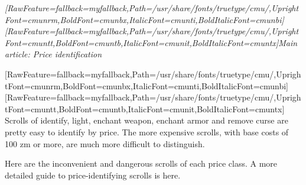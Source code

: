 \begin{myquote}
\item{}{\itshape \allowbreak{}\setmainfont{cmunti.ttf}[RawFeature={fallback=myfallback},Path=/usr/share/fonts/truetype/cmu/,UprightFont=cmunrm,BoldFont=cmunbx,ItalicFont=cmunti,BoldItalicFont=cmunbi]\setmonofont{cmunti.ttf}[RawFeature={fallback=myfallback},Path=/usr/share/fonts/truetype/cmu/,UprightFont=cmuntt,BoldFont=cmuntb,ItalicFont=cmunit,BoldItalicFont=cmuntx]\itshape Main article: Price identification\footnotemark[79]}
\end{myquote}
\allowbreak{}\setmainfont{cmunrm.ttf}[RawFeature={fallback=myfallback},Path=/usr/share/fonts/truetype/cmu/,UprightFont=cmunrm,BoldFont=cmunbx,ItalicFont=cmunti,BoldItalicFont=cmunbi]\setmonofont{cmunrm.ttf}[RawFeature={fallback=myfallback},Path=/usr/share/fonts/truetype/cmu/,UprightFont=cmuntt,BoldFont=cmuntb,ItalicFont=cmunit,BoldItalicFont=cmuntx]
Scrolls of identify\footnotemark[80], light\footnotemark[81], enchant weapon\footnotemark[82], enchant armor\footnotemark[83] and remove curse\footnotemark[84] are pretty easy to identify by price. The more expensive scrolls, with base costs of 100 zm or more, are much more difficult to distinguish.


Here are the inconvenient and dangerous scrolls of each price class. A more detailed guide to price-{}identifying scrolls is here\footnotemark[85].




